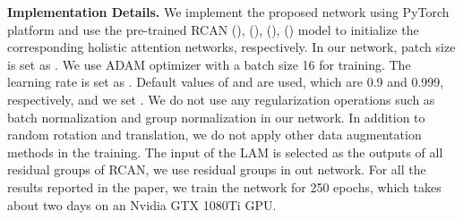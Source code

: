 \documentclass[runningheads]{llncs}
\begin{document}
\textbf{Implementation Details.} We implement the proposed network using PyTorch platform and use the pre-trained RCAN (), (), (), () model to initialize the corresponding holistic attention networks, respectively. 
In our network, patch size is set as . We use
ADAM \cite{kingma2014adam} optimizer with a batch size 16 for training. The
learning rate is set as .
Default values of  and  are used, which are 0.9 and 0.999, respectively, and we set .
We do not use any regularization operations such as batch normalization and group normalization in our network. In addition to random rotation and translation, we do not apply other data augmentation methods in the training.
The input of the LAM is selected as the outputs of all residual groups of RCAN, we use  residual groups in out network. 
For all the results reported in the paper, we train the network for  
250 epochs, which takes about two days on an Nvidia GTX 1080Ti GPU.
\end{document}

